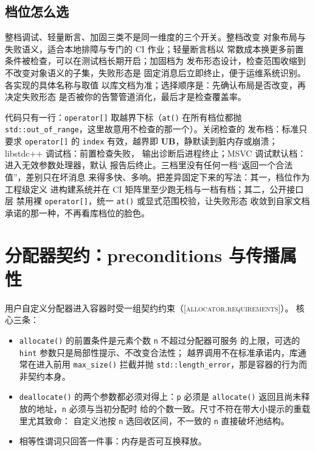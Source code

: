\documentclass[12pt,a4paper,fontset=fandol]{ctexbook}
\newcommand{\Fn}[1]{\texttt{#1()}}
\newcommand{\Tp}[1]{\texttt{#1}}
\newcommand{\Bk}{\discretionary{}{}{}}
\newcommand{\UB}{\textbf{\textsf{UB}}}
\newcommand{\Std}[1]{\textsc{[#1]}}
\begin{document}
\subsection{档位怎么选}\label{sec:ub14-tier-choice}

整档调试、轻量断言、加固三类不是同一维度的三个开关。整档改变
对象布局与失败语义，适合本地排障与专门的 CI 作业；轻量断言档以
常数成本换更多前置条件被检查，可以在测试档长期开启；加固档为
发布形态设计，检查范围收缩到不改变对象语义的子集，失败形态是
固定消息后立即终止，便于运维系统识别。各实现的具体名称与取值
以库文档为准；选择顺序是：先确认布局是否改变，再决定失败形态
是否被你的告警管道消化，最后才是检查覆盖率。

\begin{casebox}[title=同一行越界，三种档位的三种结局]
代码只有一行：\Tp{operator[]} 取越界下标（\Fn{at} 在所有档位都抛
\Tp{std::out\_of\_range}，这里故意用不检查的那一个）。关闭检查的
发布档：标准只要求 \Tp{operator[]} 的 \Tp{index} 有效，越界即
\UB{}，静默读到脏内存或崩溃；libstdc++ 调试档：前置检查失败，
输出诊断后进程终止；MSVC 调试默认档：进入无效参数处理器，默认
报告后终止。三档里没有任何一档“返回一个合法值”，差别只在坏消息
来得多快、多响。把差异固定下来的写法：其一，档位作为工程级定义
进构建系统并在 CI 矩阵里至少跑无档与一档有档；其二，公开接口层
禁用裸 \Tp{operator[]}，统一 \Fn{at} 或显式范围校验，让失败形态
收敛到自家文档承诺的那一种，不再看库档位的脸色。
\end{casebox}

\section{分配器契约：preconditions 与传播属性}\label{sec:ub14-allocator-contract}

用户自定义分配器进入容器时受一组契约约束（\Std{allocator.requirements}）。
核心三条：

\begin{itemize}
\item \Fn{allocate} 的前置条件是元素个数 \Tp{n} 不超过分配器可服务
    的上限，可选的 \Tp{hint} 参数只是局部性提示、不改变合法性；
    越界调用不在标准承诺内，库通常在进入前用 \Fn{max{\Bk}\_size}
    拦截并抛 \Tp{std::length\_error}，那是容器的行为而非契约本身。
\item \Fn{deallocate} 的两个参数都必须对得上：\Tp{p} 必须是
    \Fn{allocate} 返回且尚未释放的地址，\Tp{n} 必须与当初分配时
    给的个数一致。尺寸不符在带大小提示的重载里尤其致命：
    自定义池按 \Tp{n} 选回收区间，不一致的 \Tp{n} 直接破坏池结构。
\item 相等性谓词只回答一件事：内存是否可互换释放。
\end{itemize}
\end{document}
